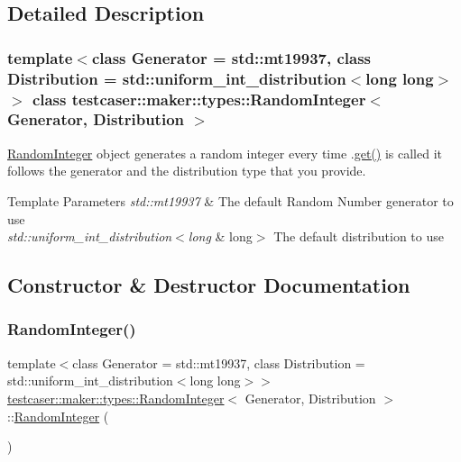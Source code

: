 \subsection{Detailed Description}
\subsubsection*{template$<$class Generator = std\+::mt19937, class Distribution = std\+::uniform\+\_\+int\+\_\+distribution$<$long long$>$$>$\newline
class testcaser\+::maker\+::types\+::\+Random\+Integer$<$ Generator, Distribution $>$}

\mbox{\hyperlink{classtestcaser_1_1maker_1_1types_1_1RandomInteger}{Random\+Integer}} object generates a random integer every time .\mbox{\hyperlink{classtestcaser_1_1maker_1_1types_1_1RandomInteger_a3b7754ca1c579f58b959ca6adb483a51}{get()}} is called it follows the generator and the distribution type that you provide. 


\begin{DoxyTemplParams}{Template Parameters}
{\em std\+::mt19937} & The default Random Number generator to use \\
\hline
{\em std\+::uniform\+\_\+int\+\_\+distribution$<$long} & long$>$ The default distribution to use \\
\hline
\end{DoxyTemplParams}


\subsection{Constructor \& Destructor Documentation}
\mbox{\label{classtestcaser_1_1maker_1_1types_1_1RandomInteger_aee8b13d2d5bad5355924313b56d321c4}} 
\subsubsection{\texorpdfstring{RandomInteger()}{RandomInteger()}\hspace{0.1cm}{\footnotesize\ttfamily [1/3]}}
{\footnotesize\ttfamily template$<$class Generator = std\+::mt19937, class Distribution = std\+::uniform\+\_\+int\+\_\+distribution$<$long long$>$$>$ \\
\mbox{\hyperlink{classtestcaser_1_1maker_1_1types_1_1RandomInteger}{testcaser\+::maker\+::types\+::\+Random\+Integer}}$<$ Generator, Distribution $>$\+::\mbox{\hyperlink{classtestcaser_1_1maker_1_1types_1_1RandomInteger}{Random\+Integer}} (\begin{DoxyParamCaption}{ }\end{DoxyParamCaption})\hspace{0.3cm}{\ttfamily [inline]}}



